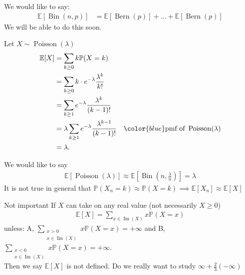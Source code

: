 \begin{note}
    We would like to say:
    \begin{align*}
        \mathbb{E}[\operatorname{Bin}(n, p)] &= \mathbb{E}[\operatorname{Bern}(p)] + \dots + \mathbb{E}[\operatorname{Bern}(p)]
    \end{align*} 
    We will be able to do this soon.
\end{note} 

\begin{example}
    Let $X \sim \operatorname{Poisson}(\lambda)$
    \begin{align*}
        \mathbb{E}[X] &= \sum_{k \geq 0} k \mathbb{P}(X = k) \\
        &= \sum_{k \geq 0} k \cdot e^{-\lambda} \frac{\lambda^k}{k!} \\
        &= \sum_{k \geq 1} e^{-\lambda} \frac{\lambda^k}{(k - 1)!} \\
        &= \lambda \sum_{k \geq 1} e^{-\lambda} \frac{\lambda^{k - 1}}{(k - 1)!} \quad \color{blue} \text{pmf of } \operatorname{Poisson}(\lambda) \\
        &= \lambda.
    \end{align*} 
\end{example} 

\begin{note}
    We would like to say
    \begin{align*}
        \mathbb{E}[\operatorname{Poisson}(\lambda)] \approx \mathbb{E}\left[\operatorname{Bin}\left(n, \frac{\lambda}{n}\right)\right] = \lambda
    \end{align*} 
    \color{blue} It is not true in general that $\mathbb{P}(X_n = k) \approx \mathbb{P}(X = k) \implies \mathbb{E}[X_n] \approx \mathbb{E}[X]$
\end{note} 

\begin{aside}{Not important}
    If $X$ can take on any real value (not necessarily $X \geq 0$)
    \begin{align*}
        \mathbb{E}[X] = \sum_{x \in \operatorname{Im}(X)} x \mathbb{P}(X = x)
    \end{align*} 
    unless: A, $\displaystyle \sum_{\substack{x > 0 \\ x \in \operatorname{Im}(X)}} x \mathbb{P}(X = x) = + \infty$ and B, $\displaystyle \sum_{\substack{x < 0 \\ x \in \operatorname{Im}(X)}} x \mathbb{P}(X = x) = + \infty$. \\
    Then we say $\mathbb{E}[X]$ is not defined.
    \color{red} Do we really want to study $\infty + \frac{2}{3} (- \infty)$ \color{black}
\end{aside} 

